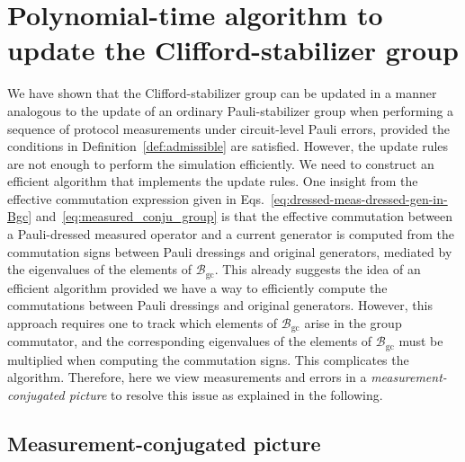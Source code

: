 \documentclass[
 reprint,
 amsmath,amssymb,
 pra,superscriptaddress, nofootinbib
]{revtex4-2}
\theoremstyle{definition}
\theoremstyle{plain}
\begin{document}
\section{Polynomial-time algorithm to update the Clifford-stabilizer group}
\label{sec:algorithm}
We have shown that the Clifford-stabilizer group can be updated in a manner analogous to the update of an ordinary Pauli-stabilizer group when performing a sequence of protocol measurements under circuit-level Pauli errors, provided the conditions in Definition~\ref{def:admissible} are satisfied.
However, the update rules are not enough to perform the simulation efficiently. We need to construct an efficient algorithm that implements the update rules.
One insight from the effective commutation expression given in Eqs.~\eqref{eq:dressed-meas-dressed-gen-in-Bgc} and~\eqref{eq:measured_conju_group} is that the effective commutation between a Pauli-dressed measured operator and a current generator is computed from the commutation signs between Pauli dressings and original generators, mediated by the eigenvalues of the elements of $\mathcal{B}_{\mathrm{gc}}$.
This already suggests the idea of an efficient algorithm provided we have a way to efficiently compute the commutations between Pauli dressings and original generators. However, this approach requires one to track which elements of $\mathcal{B}_{\mathrm{gc}}$ arise in the group commutator, and the corresponding eigenvalues of the elements of $\mathcal{B}_{\mathrm{gc}}$ must be multiplied when computing the commutation signs.
This complicates the algorithm.
Therefore, here we view measurements and errors in a \emph{measurement-conjugated picture} to resolve this issue as explained in the following.

\subsection{Measurement-conjugated picture}\label{subsec:error_conjugated_meas}
\end{document}
